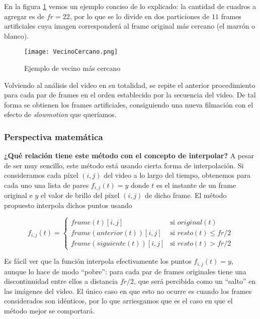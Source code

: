 En la figura \ref{fig:vecino} vemos un ejemplo conciso de lo explicado: la cantidad de cuadros a agregar es de $fr = 22$, por lo que se lo divide en dos particiones de $11$ frames artificiales cuya imagen corresponder\'a al frame original m\'as cercano (el marr\'on o blanco).

\begin{figure}[h!]
  \centering
    \texttt{[image: VecinoCercano.png]}
     \caption{Ejemplo de vecino m\'as cercano}\label{fig:vecino}
\end{figure}
\noindent

Volviendo al an\'alisis del video en su totalidad, se repite el anterior procedimiento para cada par de frames en el orden establecido por la secuencia del video. De tal forma se obtienen los frames artificiales, consiguiendo una nueva filmaci\'on con el efecto de \textit{slowmotion} que queríamos.

\subsubsection*{\bf{Perspectiva matem\'atica}}

\textbf{¿Qu\'e relaci\'on tiene este m\'etodo con el concepto de interpolar?} A pesar de ser muy sencillo, este método está usando cierta forma de interpolación. Si consideramos cada píxel $(i, j)$ del video a lo largo del tiempo, obtenemos para cada uno una lista de pares $f_{i,j}(t)=y$ donde $t$ es el instante de un frame original e $y$ el valor de brillo del píxel $(i,j)$ de dicho frame. El método propuesto interpola dichos puntos usando 

\[
f_{i,j}(t) = 
\left\{
    \begin{array}{ll}
        frame(t)[i,j] & \mbox{si } original(t) \\
        frame(anterior(t))[i,j] & \mbox{si } resto(t) \leq fr/2 \\     
        frame(siguiente(t))[i,j] & \mbox{si } resto(t) > fr/2
    \end{array}
\right.
\]

Es fácil ver que la función interpola efectivamente los puntos $f_{i,j}(t)=y$, aunque lo hace de modo ``pobre'': para cada par de frames originales tiene una discontinuidad entre ellos a distancia $fr/2$, que será percibida como un ``salto'' en las imágenes del video. El único caso en que esto no ocurre es cuando los frames considerados son idénticos, por lo que arriesgamos que es el caso en que el método mejor se comportará.

